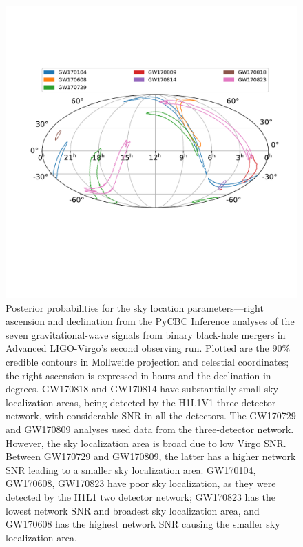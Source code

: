 \begin{figure}[ht]
  \includegraphics[width=\textwidth]{figures/o2_bbh_pe/all_o2_skymaps.pdf}
  \caption{Posterior probabilities for the sky location parameters---right ascension and declination from the PyCBC Inference analyses of the seven gravitational-wave signals from binary black-hole mergers in Advanced LIGO-Virgo's second observing run. Plotted are the 90\% credible contours in Mollweide projection and celestial coordinates; the right ascension is expressed in hours and the declination in degrees. GW170818 and GW170814 have substantially small sky localization areas, being detected by the H1L1V1 three-detector network, with considerable SNR in all the detectors. The GW170729 and GW170809 analyses used data from the three-detector network. However, the sky localization area is broad due to low Virgo SNR. Between GW170729 and GW170809, the latter has a higher network SNR leading to a smaller sky localization area. GW170104, GW170608, GW170823 have poor sky localization, as they were detected by the H1L1 two detector network; GW170823 has the lowest network SNR and broadest sky localization area, and GW170608 has the highest network SNR causing the smaller sky localization area. \label{fig:skymap_plots}
 }
\end{figure}


